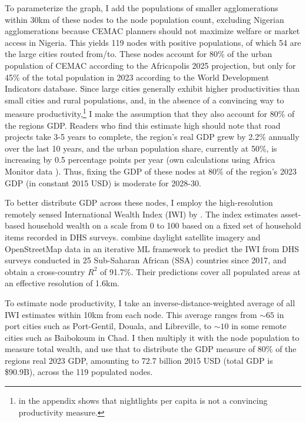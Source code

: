 \documentclass[a4paper]{article}
\begin{document}
To parameterize the graph, I add the populations of smaller agglomerations within 30km of these nodes to the node population count, excluding Nigerian agglomerations because CEMAC planners should not maximize welfare or market access in Nigeria. This yields 119 nodes with positive populations, of which 54 are the large cities routed from/to. These nodes account for 80\% of the urban population of CEMAC according to the Africapolis 2025 projection, but only for 45\% of the total population in 2023 according to the World Development Indicators database. Since large cities generally exhibit higher productivities than small cities and rural populations, and, in the absence of a convincing way to measure productivity,\footnote{\citet{krantz2024optimal} in the appendix shows that nightlights per capita is not a convincing productivity measure. \vspace{-3mm}} I make the assumption that they also account for 80\% of the regions GDP. Readers who find this estimate high should note that road projects take 3-5 years to complete, the region's real GDP grew by 2.2\% annually over the last 10 years, and the urban population share, currently at 50\%, is increasing by 0.5 percentage points per year (own calculations using Africa Monitor data \citep{krantz2023africamonitor}). Thus, fixing the GDP of these nodes at 80\% of the region's 2023 GDP (in constant 2015 USD) is moderate for 2028-30.   \newline 

  To better distribute GDP across these nodes, I employ the high-resolution remotely sensed International Wealth Index (IWI) by \citet{lee2022high}. The index estimates asset-based household wealth on a scale from 0 to 100 based on a fixed set of household items recorded in DHS surveys. \citet{lee2022high} combine daylight satellite imagery and OpenStreetMap data in an iterative ML framework to predict the IWI from DHS surveys conducted in 25 Sub-Saharan African (SSA) countries since 2017, and obtain a cross-country $R^2$ of 91.7\%. Their predictions cover all populated areas at an effective resolution of 1.6km. \newline 
  
  To estimate node productivity, I take an inverse-distance-weighted average of all IWI estimates within 10km from each node. This average ranges from $\sim 65$ in port cities such as Port-Gentil, Douala, and Libreville, to $\sim 10$ in some remote cities such as Baibokoum in Chad. I then multiply it with the node population to measure total wealth, and use that to distribute the GDP measure of 80\% of the regions real 2023 GDP, amounting to 72.7 billion 2015 USD (total GDP is \$90.9B), across the 119 populated nodes. \newline 
  
\end{document}
